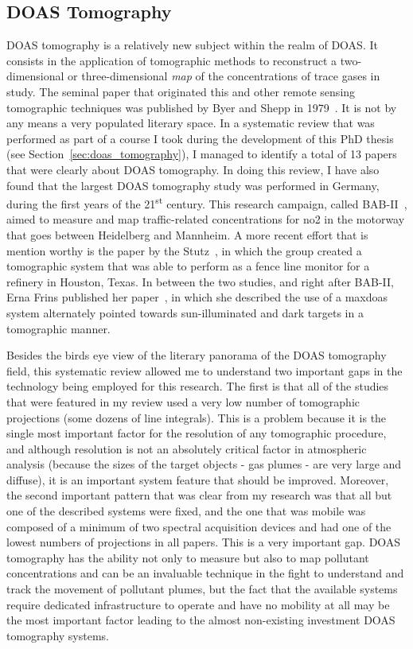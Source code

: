 \subsection{DOAS Tomography}%
\label{sub:doas_tomography}

\gls{DOAS} tomography is a relatively new subject within the realm of
\gls{DOAS}. It consists in the application of tomographic methods to
reconstruct a two-dimensional or three-dimensional \emph{map} of the
concentrations of trace gases in study. The seminal paper that
originated this and other remote sensing tomographic techniques was
published by Byer and Shepp in 1979~\cite{Byer1979}. It is not by any
means a very populated literary space. In a systematic review that was
performed as part of a course I took during the development of this PhD
thesis (see Section~\ref{sec:doas_tomography}), I managed to identify a
total of 13 papers that were clearly about \gls{DOAS} tomography. In
doing this review, I have also found that the largest \gls{DOAS}
tomography study was performed in Germany, during the first years of the
21\textsuperscript{st} century. This research campaign, called
BAB-II~\cite{Laepple2004}, aimed to measure and map traffic-related
concentrations for \gls{no2} in the motorway that goes between
Heidelberg and Mannheim. A more recent effort that is mention worthy is
the paper by the Stutz~\cite{Stutz2016}, in which the group created a
tomographic system that was able to perform as a fence  line monitor for
a refinery in Houston, Texas. In between the two studies, and right
after BAB-II, Erna Frins published her paper~\cite{Frins2006}, in which
she described the use of a \gls{maxdoas} system alternately pointed
towards sun-illuminated and dark targets in a tomographic manner.

Besides the birds eye view of the literary panorama of the \gls{DOAS}
tomography field, this systematic review allowed me to understand two
important gaps in the technology being employed for this research. The
first is that all of the studies that were featured in my review used a
very low number of tomographic projections (some dozens of line
integrals). This is a problem because it is the single most important
factor for the resolution of any tomographic procedure, and although
resolution is not an absolutely critical factor in atmospheric analysis
(because the sizes of the target objects - gas plumes - are very large
and diffuse), it is an important system feature that should be improved.
Moreover, the second important pattern that was clear from my research
was that all but one of the described systems were fixed, and the one
that was mobile was composed of a minimum of two spectral acquisition
devices and had one of the lowest numbers of projections in all papers.
This is a very important gap. \gls{DOAS} tomography has the ability not
only to measure but also to map pollutant concentrations and can be an
invaluable technique in the fight to understand and track the movement
of pollutant plumes, but the fact that the available systems require
dedicated infrastructure to operate and have no mobility at all may be
the most important factor leading to the almost non-existing investment
\gls{DOAS} tomography systems.

